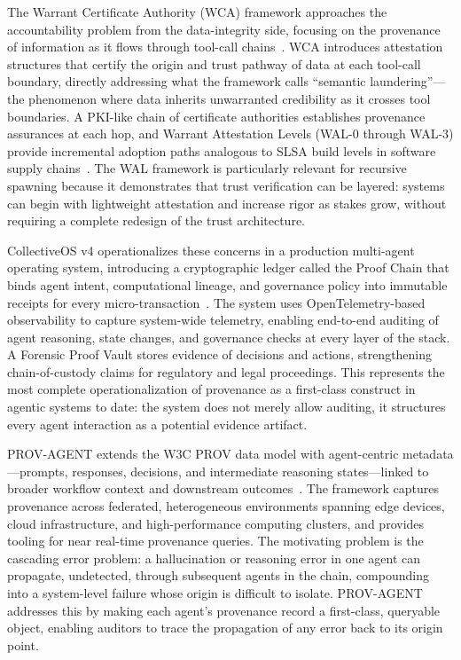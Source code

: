 The Warrant Certificate Authority (WCA) framework approaches the accountability problem from the data-integrity side, focusing on the provenance of information as it flows through tool-call chains~\cite{sentinelagent2026}. WCA introduces attestation structures that certify the origin and trust pathway of data at each tool-call boundary, directly addressing what the framework calls ``semantic laundering''---the phenomenon where data inherits unwarranted credibility as it crosses tool boundaries. A PKI-like chain of certificate authorities establishes provenance assurances at each hop, and Warrant Attestation Levels (WAL-0 through WAL-3) provide incremental adoption paths analogous to SLSA build levels in software supply chains~\cite{sentinelagent2026}. The WAL framework is particularly relevant for recursive spawning because it demonstrates that trust verification can be layered: systems can begin with lightweight attestation and increase rigor as stakes grow, without requiring a complete redesign of the trust architecture.

CollectiveOS v4 operationalizes these concerns in a production multi-agent operating system, introducing a cryptographic ledger called the Proof Chain that binds agent intent, computational lineage, and governance policy into immutable receipts for every micro-transaction~\cite{collectiveos2025}. The system uses OpenTelemetry-based observability to capture system-wide telemetry, enabling end-to-end auditing of agent reasoning, state changes, and governance checks at every layer of the stack. A Forensic Proof Vault stores evidence of decisions and actions, strengthening chain-of-custody claims for regulatory and legal proceedings. This represents the most complete operationalization of provenance as a first-class construct in agentic systems to date: the system does not merely allow auditing, it structures every agent interaction as a potential evidence artifact.

PROV-AGENT extends the W3C PROV data model with agent-centric metadata---prompts, responses, decisions, and intermediate reasoning states---linked to broader workflow context and downstream outcomes~\cite{proveagent2025}. The framework captures provenance across federated, heterogeneous environments spanning edge devices, cloud infrastructure, and high-performance computing clusters, and provides tooling for near real-time provenance queries. The motivating problem is the cascading error problem: a hallucination or reasoning error in one agent can propagate, undetected, through subsequent agents in the chain, compounding into a system-level failure whose origin is difficult to isolate. PROV-AGENT addresses this by making each agent's provenance record a first-class, queryable object, enabling auditors to trace the propagation of any error back to its origin point.

